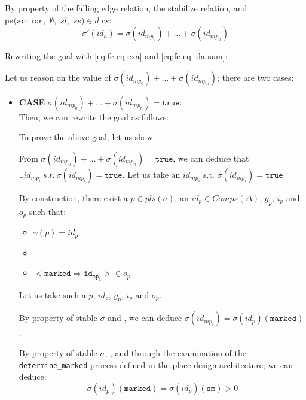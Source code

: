 \documentclass[dvipsnames,12pt]{article}
\begin{document}
\begin{niproof}
\begin{itemize}
    \noindent{}By property of the
    \hvhdl{} falling edge relation, the stabilize relation, and\\
    $\mathtt{ps}(\texttt{action},$ $\emptyset,$ $sl,$ $ss)\in{}d.cs$:
    \begin{equation}
      \sigma'(id_a)=\sigma(id_{mp_0})+\dots+\sigma(id_{mp_n})\label{eq:fe-eq-ida-sum}
    \end{equation}

    Rewriting the goal with \eqref{eq:fe-eq-exa} and
    \eqref{eq:fe-eq-ida-sum}:\\

    Let us reason on the value of $\sigma(id_{mp_0})+\dots+\sigma(id_{mp_n})$; there are two cases:

    \begin{itemize}
    \item \textbf{CASE} $\sigma(id_{mp_0})+\dots+\sigma(id_{mp_n})=\mathtt{true}$:\\
      \noindent{}Then, we can rewrite the goal as follows:

      \noindent{}To prove the above goal, let us show

      \noindent{}From
      $\sigma(id_{mp_0})+\dots+\sigma(id_{mp_n})=\mathtt{true}$, we
      can deduce that
      $\exists{}id_{mp_i}~s.t.~\sigma(id_{mp_i})=\mathtt{true}$. Let
      us take an $id_{mp_i}$ s.t. $\sigma(id_{mp_i})=\mathtt{true}$.

      \noindent{}By construction, there exist a $p\in{}pls(a)$, an
      $id_{p}\in{}Comps(\Delta)$, $g_{p}$, $i_{p}$ and
      $o_{p}$ such that:
      \begin{itemize}
      \item $\gamma(p)=id_{p}$
      \item \InCsCompP
      \item ${<}\mathtt{marked\Rightarrow{}id_{mp_i}}{>}\in{}o_{p}$
      \end{itemize}
      Let us take such a $p$, $id_{p}$, $g_{p}$, $i_{p}$ and
      $o_{p}$.

      By property of stable $\sigma$ and \InCsCompP, we can deduce
      $\sigma(id_{mp_i})=\sigma(id_{p})(\texttt{marked})$.

      By property of stable $\sigma$, \InCsCompP, and through the
      examination of the \texttt{determine_marked} process defined in
      the place design architecture, we can deduce:
      \begin{equation}
        \sigma(id_{p})(\texttt{marked})=\sigma(id_{p})(\texttt{sm})>0\label{eq:fe-gt-sm-zero}
      \end{equation}


\end{itemize}
\end{itemize}
\end{niproof}
\end{document}
